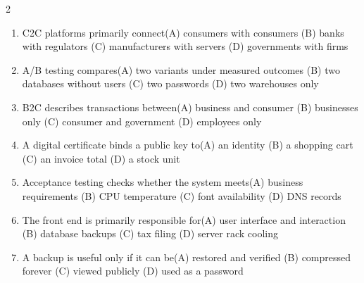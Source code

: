 \documentclass[a4paper]{article}
\begin{document}
\begin{multicols*}{2}
\begin{enumerate}
\item C2C platforms primarily connect\newline\hspace*{0.6em}(A) consumers with consumers \quad (B) banks with regulators \newline\hspace*{0.6em}(C) manufacturers with servers \quad (D) governments with firms
\item A/B testing compares\newline\hspace*{0.6em}(A) two variants under measured outcomes \quad (B) two databases without users \newline\hspace*{0.6em}(C) two passwords \quad (D) two warehouses only
\item B2C describes transactions between\newline\hspace*{0.6em}(A) business and consumer \quad (B) businesses only \newline\hspace*{0.6em}(C) consumer and government \quad (D) employees only
\item A digital certificate binds a public key to\newline\hspace*{0.6em}(A) an identity \quad (B) a shopping cart \newline\hspace*{0.6em}(C) an invoice total \quad (D) a stock unit
\item Acceptance testing checks whether the system meets\newline\hspace*{0.6em}(A) business requirements \quad (B) CPU temperature \newline\hspace*{0.6em}(C) font availability \quad (D) DNS records
\item The front end is primarily responsible for\newline\hspace*{0.6em}(A) user interface and interaction \quad (B) database backups \newline\hspace*{0.6em}(C) tax filing \quad (D) server rack cooling
\item A backup is useful only if it can be\newline\hspace*{0.6em}(A) restored and verified \quad (B) compressed forever \newline\hspace*{0.6em}(C) viewed publicly \quad (D) used as a password

\end{enumerate}
\end{multicols*}
\end{document}
